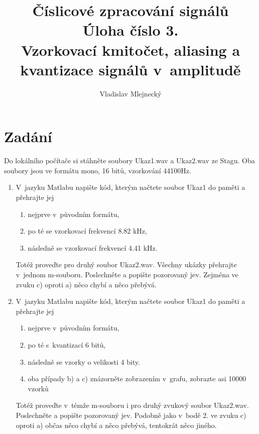 \documentclass[11pt, a4paper]{article}
\author{Vladislav Mlejnecký}
\title{%
  Číslicové zpracování signálů\\
  \large Úloha číslo 3.\\
  Vzorkovací kmitočet, aliasing a kvantizace signálů v amplitudě}
\begin{document}
    \maketitle

    \section{Zadání}
    
    Do lokálního počítače si stáhněte soubory Ukaz1.wav a Ukaz2.wav ze Stagu. Oba soubory jsou ve formátu mono, 16 bitů, vzorkování 44100Hz.

    \begin{enumerate}
        \item
        V jazyku Matlabu napište kód, kterým načtete soubor Ukaz1 do paměti a přehrajte jej 
        \begin{enumerate}[label=(\alph*)]
            \item
            nejprve v původním formátu, 
            \item
            po té se vzorkovací frekvencí 8.82 kHz, 
            \item
            následně se vzorkovací frekvencí 4.41 kHz. 
        \end{enumerate}
        
        Totéž proveďte pro druhý soubor Ukaz2.wav. Všechny ukázky přehrajte v jednom m-souboru. Poslechněte a popište pozorovaný jev. Zejména ve zvuku c) oproti a) něco chybí a něco přebývá.
        
        \item
        
        V jazyku Matlabu napište kód, kterým načtete soubor Ukaz1 do paměti a přehrajte jej 
        
        \begin{enumerate}[label=(\alph*)]
            \item
            nejprve v původním formátu, 
            \item
            po té  s kvantizací 6 bitů, 
            \item
            následně se vzorky o velikosti 4 bity.
            \item
            oba případy b) a c) znázorněte zobrazením v grafu, zobrazte asi 10000 vzorků
        \end{enumerate}
        Totéž proveďte v témže m-souboru i pro druhý zvukový soubor Ukaz2.wav. Poslechněte a popište pozorovaný jev. Podobně jako v bodě 2. ve zvuku c) oproti a) občas něco chybí a něco přebývá, tentokrát něco jiného.
    \end{enumerate}
    
\end{document}
